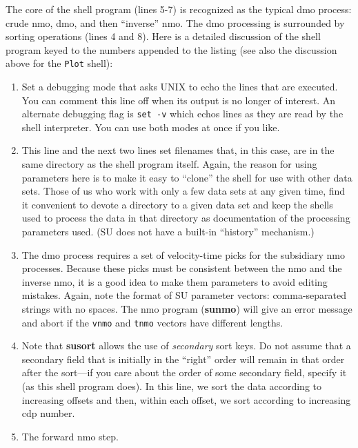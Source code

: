 {{{{{{{The core of the shell program (lines 5-7) is recognized as the typical
dmo process: crude nmo, dmo, and then ``inverse'' nmo.
The dmo processing is surrounded by sorting operations
(lines 4 and 8).  Here is a detailed discussion of the shell program
keyed to the numbers appended to the listing (see also the discussion
above for the \verb:Plot: shell):

\begin{enumerate}
\item Set a debugging mode that asks UNIX
to echo the lines that are executed.  You can comment
this line off when its output is no longer of interest.  An
alternate debugging flag is \verb:set -v: which echos
lines as they are read by the shell interpreter.  You
can use both modes at once if you like.

\item This line and the next two lines set filenames that,
in this case, are in the same directory as the shell program itself.
Again, the reason for using parameters here is to make it easy
to ``clone'' the shell for use with other data sets.
Those of us who work with only a few data sets at any given time,
find it convenient to devote a directory to a given data set and
keep the shells used to process the data in that directory as
documentation of the processing parameters used.  ({\small\sf SU} does not have
a built-in ``history'' mechanism.)

\item The dmo process requires a set of velocity-time picks for
the subsidiary nmo processes.  Because these picks must be consistent
between the nmo and the inverse nmo, it is a good idea to make them
parameters to avoid editing mistakes.  Again, note the format
of {\small\sf SU} parameter vectors: comma-separated strings with no spaces.
The nmo program ({\bf sunmo}) will give an error message and abort
if the \verb:vnmo: and \verb:tnmo: vectors have different lengths.

\item Note that {\bf susort} allows the use of {\em secondary}
sort keys.  Do not assume that a secondary field that is
initially in the ``right'' order will remain in that order
after the sort---if you care about the order of some secondary
field, specify it (as this shell program does). In this line,
we sort the data according to increasing offsets and then, within
each offset, we sort according to increasing cdp number.

\item The forward nmo step.


\end{enumerate}}}}}}}}
